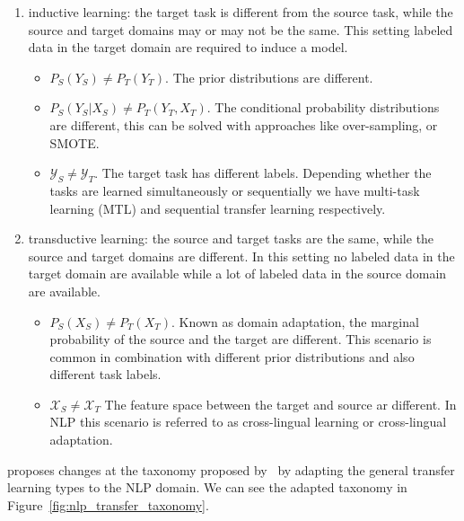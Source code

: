 \begin{enumerate}[a -]
    \item inductive learning: the target task is different from the source task, while the source and target domains may or may not be the same. This setting labeled data in the target domain are required to induce a model.
        \begin{itemize}
            \item $P_S(Y_S) \neq P_T(Y_T)$. The prior distributions are different. 
            \item $P_S(Y_S | X_S) \neq P_T(Y_T, X_T)$. The conditional probability distributions are different, this can be solved with approaches like over-sampling, or SMOTE.
            \item $\mathcal{Y}_S \neq \mathcal{Y}_T$. The target task has different labels. Depending whether the tasks are learned simultaneously or sequentially we have multi-task learning (MTL) and sequential transfer learning respectively.  
        \end{itemize}
    
    \item transductive learning: the source and target tasks are the same, while the source and target domains are different. In this setting no labeled data in the target domain are available while a lot of labeled data in the source domain are available.
        \begin{itemize}
            \item $P_S(X_S) \neq P_T(X_T)$. Known as domain adaptation, the marginal probability of the source and the target are different. This scenario is common in combination with different prior distributions and also different task labels.
            \item $\mathcal{X}_S \neq \mathcal{X}_T$ The feature space between the target and source ar different. In NLP this scenario is referred to as cross-lingual learning or cross-lingual adaptation.
        \end{itemize}

\end{enumerate}

\citet{ruder2019neural} proposes changes at the taxonomy proposed by~\citet{pan2010transfer} by adapting the general transfer learning types to the NLP domain. We can see the adapted taxonomy in Figure~\ref{fig:nlp_transfer_taxonomy}.


